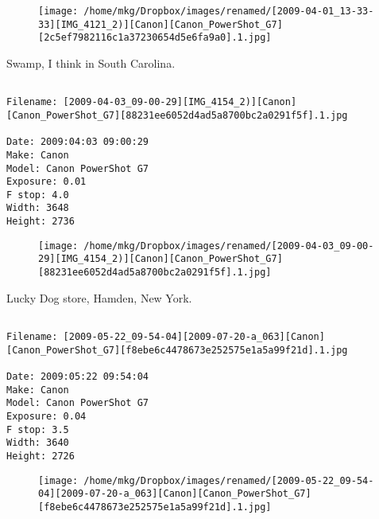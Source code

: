 \begin{figure}
\texttt{[image: /home/mkg/Dropbox/images/renamed/[2009-04-01\_13-33-33][IMG\_4121\_2)][Canon][Canon\_PowerShot\_G7][2c5ef7982116c1a37230654d5e6fa9a0].1.jpg]}
\end{figure}
    
\clearpage
\onecolumn
\noindent Swamp, I think in South Carolina.
\noindent
\begin{lstlisting}

Filename: [2009-04-03_09-00-29][IMG_4154_2)][Canon][Canon_PowerShot_G7][88231ee6052d4ad5a8700bc2a0291f5f].1.jpg

Date: 2009:04:03 09:00:29
Make: Canon
Model: Canon PowerShot G7
Exposure: 0.01
F stop: 4.0
Width: 3648
Height: 2736
\end{lstlisting}
\clearpage

\begin{figure}
\texttt{[image: /home/mkg/Dropbox/images/renamed/[2009-04-03\_09-00-29][IMG\_4154\_2)][Canon][Canon\_PowerShot\_G7][88231ee6052d4ad5a8700bc2a0291f5f].1.jpg]}
\end{figure}
    
\clearpage
\onecolumn
\noindent Lucky Dog store, Hamden, New York.
\noindent
\begin{lstlisting}

Filename: [2009-05-22_09-54-04][2009-07-20-a_063][Canon][Canon_PowerShot_G7][f8ebe6c4478673e252575e1a5a99f21d].1.jpg

Date: 2009:05:22 09:54:04
Make: Canon
Model: Canon PowerShot G7
Exposure: 0.04
F stop: 3.5
Width: 3640
Height: 2726
\end{lstlisting}
\clearpage

\begin{figure}
\texttt{[image: /home/mkg/Dropbox/images/renamed/[2009-05-22\_09-54-04][2009-07-20-a\_063][Canon][Canon\_PowerShot\_G7][f8ebe6c4478673e252575e1a5a99f21d].1.jpg]}
\end{figure}
    
